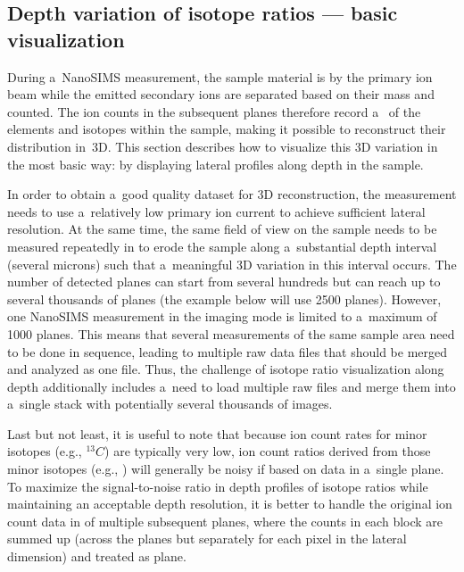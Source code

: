 \subsection{Depth variation of isotope ratios --- basic visualization}
\setcounter{step}{0}

During a~NanoSIMS measurement, the sample material is  by the primary ion beam while the emitted secondary ions are separated based on their mass and counted. The ion counts in the subsequent planes therefore record a~ of the elements and isotopes within the sample, making it possible to reconstruct their distribution in~3D. This section describes how to visualize this 3D variation in the most basic way: by displaying lateral profiles along depth in the sample.
\tcbe

In order to obtain a~good quality dataset for 3D reconstruction, the measurement needs to use a~relatively low primary ion current to achieve sufficient lateral resolution. At the same time, the same field of view on the sample needs to be measured repeatedly in  to erode the sample along a~substantial depth interval (several microns) such that a~meaningful 3D variation in this interval occurs. The number of detected planes can start from several hundreds but can reach up to several thousands of planes (the example below will use 2500 planes). However, one NanoSIMS measurement in the imaging mode is limited to a~maximum of 1000 planes. This means that several measurements of the same sample area need to be done in sequence, leading to multiple raw data files that should be merged and analyzed as one file. Thus, the challenge of isotope ratio visualization along depth additionally includes a~need to load multiple raw files and merge them into a~single stack with potentially several thousands of images. 

Last but not least, it is useful to note that because ion count rates for minor isotopes (e.g., ${}^{13}C$) are typically very low, ion count ratios derived from those minor isotopes (e.g., ) will generally be noisy if based on data in a~single plane. To maximize the signal-to-noise ratio in depth profiles of isotope ratios while maintaining an acceptable depth resolution, it is better to handle the original ion count data in  of multiple subsequent planes, where the counts in each block are summed up (across the planes but separately for each pixel in the lateral dimension) and treated as  plane.  

